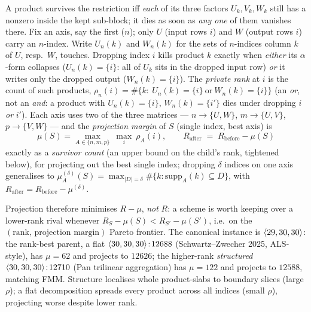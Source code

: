 A product survives the restriction iff \emph{each} of its three factors \(U_k,V_k,W_k\)
still has a nonzero inside the kept sub-block; it dies as soon as \emph{any one} of them
vanishes there. Fix an axis, say the first (\(n\)); only \(U\) (input rows \(i\)) and
\(W\) (output rows \(i\)) carry an \(n\)-index. Write \(U_n(k)\) and \(W_n(k)\) for the
sets of \(n\)-indices column \(k\) of \(U\), resp.\ \(W\), touches. Dropping index \(i\)
kills product \(k\) exactly when \emph{either} its \(\alpha\)-form collapses
(\(U_n(k)=\{i\}\): all of \(U_k\) sits in the dropped input row) \emph{or} it writes only
the dropped output (\(W_n(k)=\{i\}\)). The \emph{private rank} at \(i\) is the count of
such products, \(\rho_n(i)=\#\bigl\{k:\ U_n(k)=\{i\}\ \text{or}\ W_n(k)=\{i\}\bigr\}\) (an
\emph{or}, not an \emph{and}: a product with \(U_n(k)=\{i\}\), \(W_n(k)=\{i'\}\) dies under
dropping \(i\) \emph{or} \(i'\)). Each axis uses two of the three matrices ---
\(n\!\to\!\{U,W\}\), \(m\!\to\!\{U,V\}\), \(p\!\to\!\{V,W\}\) --- and the \emph{projection
margin} of \(S\) (single index, best axis) is
\[
  \mu(S)=\max_{A\in\{n,m,p\}}\ \max_{i}\ \rho_A(i), \qquad
  R_{\text{after}} \;=\; R_{\text{before}}-\mu(S)
\]
exactly as a \emph{survivor count} (an upper bound on the child's rank, tightened below),
for projecting out the best single index; dropping \(\delta\) indices on one axis
generalises to \(\mu^{(\delta)}_A(S)=\max_{|D|=\delta}\#\{k:\mathrm{supp}_A(k)\subseteq
D\}\), with \(R_{\text{after}}=R_{\text{before}}-\mu^{(\delta)}\).

Projection therefore minimises \(R-\mu\), \emph{not} \(R\): a scheme is worth keeping over
a lower-rank rival whenever \(R_S-\mu(S)<R_{S'}-\mu(S')\), i.e.\ on the
\((\text{rank},\,\text{projection margin})\) Pareto frontier. The canonical instance is
\(\langle 29, 30, 30 \rangle\): the rank-best parent, a flat \(\langle 30, 30, 30 \rangle\!:\!12688\)
(Schwartz--Zwecher 2025, ALS-style), has \(\mu=62\) and projects to \(12626\); the
higher-rank \emph{structured} \(\langle 30, 30, 30 \rangle\!:\!12710\) (Pan trilinear
aggregation) has \(\mu=122\) and projects to \(12588\), matching FMM. Structure localises
whole product-slabs to boundary slices (large \(\rho\)); a flat decomposition spreads
every product across all indices (small \(\rho\)), projecting worse despite lower rank.

